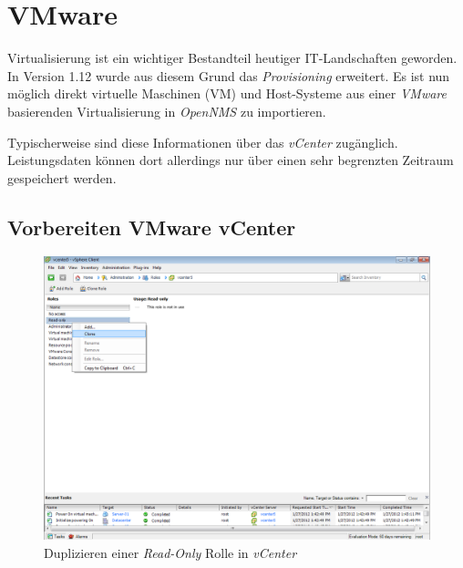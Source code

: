 \section{VMware}
Virtualisierung ist ein wichtiger Bestandteil heutiger IT-Landschaften geworden. In Version 1.12 wurde aus diesem Grund das \emph{Provisioning} erweitert. Es ist nun möglich direkt virtuelle Maschinen (VM) und Host-Systeme aus einer \emph{VMware} basierenden Virtualisierung in \emph{OpenNMS} zu importieren.

Typischerweise sind diese Informationen über das \emph{vCenter} zugänglich. Leistungsdaten können dort allerdings nur über einen sehr begrenzten Zeitraum gespeichert werden.

\subsection{Vorbereiten VMware vCenter}

\begin{figure}[H]
	\centering
	\includegraphics[width=1.0\textwidth]{images/3rd-party/vmware/0-cloning}
	\caption{Duplizieren einer \emph{Read-Only} Rolle in \emph{vCenter}}
	\label{pic:vmware-cloning}
\end{figure}

